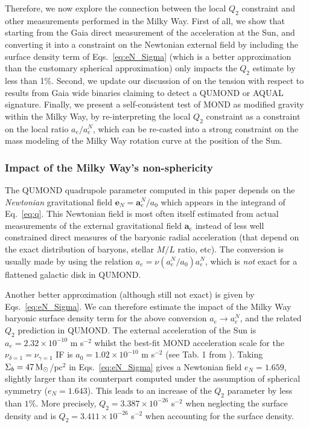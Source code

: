 \documentclass[reprint,nofootinbib,prd,aps]{revtex4-2}
\begin{document}
Therefore, we now explore the connection between the local $Q_2$ constraint and other measurements performed in the Milky Way. First of all, we show that starting from the Gaia \cite{gaia-collaboration:2021aa} direct measurement of the acceleration at the Sun, and converting it into a constraint on the Newtonian external field by including the surface density term of Eqs.~\eqref{eq:eN_Sigma} (which is a better approximation than the customary spherical approximation) only impacts the $Q_2$ estimate by less than  1\%. Second, we update our discussion of \cite{Desmond_Cassini} on the tension with respect to results from Gaia wide binaries claiming to detect a QUMOND or AQUAL signature. Finally, we present a self-consistent test of MOND as modified gravity within the Milky Way, by re-interpreting the local $Q_2$ constraint as a constraint on the local ratio $a_e/a^N_e$, which can be re-casted into a strong constraint on the mass modeling of the Milky Way rotation curve at the position of the Sun.


\subsubsection{Impact of the Milky Way's non-sphericity}
The QUMOND quadrupole parameter computed in this paper depends on the {\it Newtonian} gravitational field $\bm e_N = \bm a_e^N/a_0$ which appears in the integrand of Eq.~\eqref{eq:q}. This Newtonian field is most often \cite{hees:2016mi,Desmond_Cassini} itself estimated from actual measurements of the external gravitational field $\bm a_e$ \cite{gaia-collaboration:2021aa} instead of less well constrained direct measures of the baryonic radial acceleration (that depend on the exact distribution of baryons, stellar $M/L$ ratio, etc). The conversion is usually made by using the relation $a_e = \nu({a^N_e/a_0})a^N_e$, which is \emph{not} exact for a flattened galactic disk in QUMOND.

Another better approximation (although still not exact) is given \cite{FamaeyDura} by Eqs.~\eqref{eq:eN_Sigma}. We can therefore estimate the impact of the Milky Way baryonic surface density term for the above conversion $a_e \rightarrow a^N_e$, and the related $Q_2$ prediction in QUMOND. The external acceleration of the Sun is $a_e = 2.32\times 10^{-10}$ m s$^{-2}$ \cite{gaia-collaboration:2021aa} whilst the best-fit MOND acceleration scale for the $\nu_{\delta=1}=\nu_{\gamma=1}$ IF is $a_0=1.02\times 10^{-10}$  m s$^{-2}$ (see Tab. 1 from \cite{Desmond_Cassini}). Taking $\Sigma_b=47 \, {\rm M}_\odot$/pc$^2$ \cite{bland-hawthorn:2016aa} in Eqs.~\eqref{eq:eN_Sigma} gives a Newtonian field $e_N=1.659$, slightly larger than its counterpart computed under the assumption of spherical symmetry ($e_N=1.643$). This leads to an increase of the $Q_2$ parameter by less than $1\%$. More precisely, $Q_2=3.387\times 10^{-26}$ s$^{-2}$ when neglecting the surface density and is $Q_2=3.411\times 10^{-26}$ s$^{-2}$ when accounting for the surface density.
\end{document}
